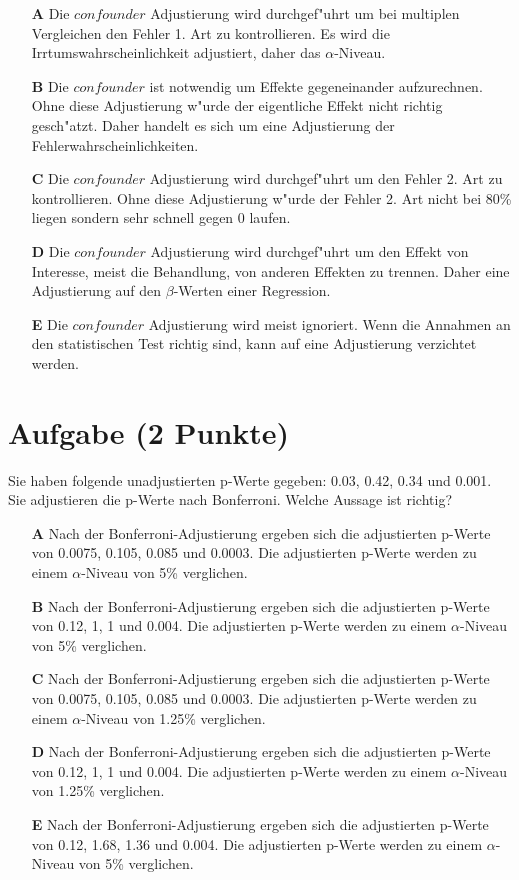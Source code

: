 \documentclass[a4paper, 10pt]{scrartcl}\usepackage[]{graphicx}\usepackage[]{xcolor}
\begin{document}
\begin{enumerate}
\item [\textbf{A} \msquare] Die $confounder$ Adjustierung wird durchgef{"u}hrt um bei multiplen Vergleichen den Fehler 1. Art zu kontrollieren. Es wird die Irrtumswahrscheinlichkeit adjustiert, daher das $\alpha$-Niveau.
\item [\textbf{B} \msquare] Die $confounder$ ist notwendig um Effekte gegeneinander aufzurechnen. Ohne diese Adjustierung w{"u}rde der eigentliche Effekt nicht richtig gesch{"a}tzt. Daher handelt es sich um eine Adjustierung der Fehlerwahrscheinlichkeiten.
\item [\textbf{C} \msquare] Die $confounder$ Adjustierung wird durchgef{"u}hrt um den Fehler 2. Art zu kontrollieren. Ohne diese Adjustierung w{"u}rde der Fehler 2. Art nicht bei 80\% liegen sondern sehr schnell gegen 0 laufen.
\item [\textbf{D} \msquare] Die $confounder$ Adjustierung wird durchgef{"u}hrt um den Effekt von Interesse, meist die Behandlung, von anderen Effekten zu trennen. Daher eine Adjustierung auf den $\beta$-Werten einer Regression.
\item [\textbf{E} \msquare] Die $confounder$ Adjustierung wird meist ignoriert. Wenn die Annahmen an den statistischen Test richtig sind, kann auf eine Adjustierung verzichtet werden.
\end{enumerate} 

\section{Aufgabe \hfill (2 Punkte)}



Sie haben folgende unadjustierten p-Werte gegeben: 0.03, 0.42, 0.34 und 0.001. Sie adjustieren die p-Werte nach
Bonferroni. Welche Aussage ist richtig?



\begin{enumerate}
\item [\textbf{A} \msquare] Nach der Bonferroni-Adjustierung ergeben sich die adjustierten p-Werte von 0.0075, 0.105, 0.085 und 0.0003. Die adjustierten p-Werte werden zu einem $\alpha$-Niveau von 5\% verglichen.
\item [\textbf{B} \msquare] Nach der Bonferroni-Adjustierung ergeben sich die adjustierten p-Werte von 0.12, 1, 1 und 0.004. Die adjustierten p-Werte werden zu einem $\alpha$-Niveau von 5\% verglichen.
\item [\textbf{C} \msquare] Nach der Bonferroni-Adjustierung ergeben sich die adjustierten p-Werte von 0.0075, 0.105, 0.085 und 0.0003. Die adjustierten p-Werte werden zu einem $\alpha$-Niveau von 1.25\% verglichen.
\item [\textbf{D} \msquare] Nach der Bonferroni-Adjustierung ergeben sich die adjustierten p-Werte von 0.12, 1, 1 und 0.004. Die adjustierten p-Werte werden zu einem $\alpha$-Niveau von 1.25\% verglichen.
\item [\textbf{E} \msquare] Nach der Bonferroni-Adjustierung ergeben sich die adjustierten p-Werte von 0.12, 1.68, 1.36 und 0.004. Die adjustierten p-Werte werden zu einem $\alpha$-Niveau von 5\% verglichen.
\end{enumerate} 
\end{document}
